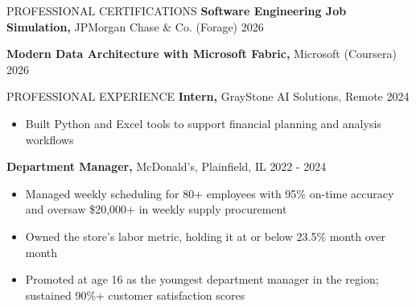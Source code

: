 \documentclass{resume}
\begin{document}
\begin{rSection}{PROFESSIONAL CERTIFICATIONS} \itemsep -3pt
\textbf{Software Engineering Job Simulation,} JPMorgan Chase \& Co. (Forage) \hfill{2026}

\textbf{Modern Data Architecture with Microsoft Fabric,} Microsoft (Coursera) \hfill{2026}
\end{rSection}

\begin{rSection}{PROFESSIONAL EXPERIENCE} \itemsep -3pt
{\textbf{Intern,} GrayStone AI Solutions, Remote} \hfill {2024}
\vspace{-5pt}
\begin{itemize}
\setlength\itemsep{-1.5ex}
    \item Built Python and Excel tools to support financial planning and analysis workflows
\end{itemize}

{\textbf{Department Manager,} McDonald's, Plainfield, IL} \hfill {2022 - 2024}
\vspace{-5pt}
\begin{itemize}
\setlength\itemsep{-1.5ex}
    \item Managed weekly scheduling for 80+ employees with 95\% on-time accuracy and oversaw \$20,000+ in weekly supply procurement
    \item Owned the store's labor metric, holding it at or below 23.5\% month over month
    \item Promoted at age 16 as the youngest department manager in the region; sustained 90\%+ customer satisfaction scores
\end{itemize}
\end{rSection}
\end{document}
